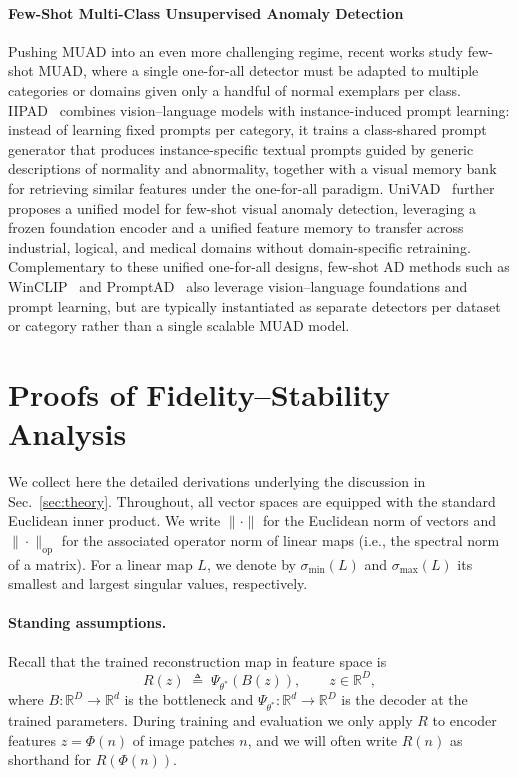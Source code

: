 \documentclass{article}
\theoremstyle{plain}
\theoremstyle{definition}
\theoremstyle{remark}
\begin{document}
\paragraph{Few-Shot Multi-Class Unsupervised Anomaly Detection}
Pushing MUAD into an even more challenging regime, recent works study few-shot MUAD, where a single one-for-all detector must be adapted to multiple categories or domains given only a handful of normal exemplars per class. IIPAD~\cite{lvone} combines vision--language models with instance-induced prompt learning: instead of learning fixed prompts per category, it trains a class-shared prompt generator that produces instance-specific textual prompts guided by generic descriptions of normality and abnormality, together with a visual memory bank for retrieving similar features under the one-for-all paradigm. UniVAD~\cite{gu2025univad} further proposes a unified model for few-shot visual anomaly detection, leveraging a frozen foundation encoder and a unified feature memory to transfer across industrial, logical, and medical domains without domain-specific retraining. Complementary to these unified one-for-all designs, few-shot AD methods such as WinCLIP~\cite{jeong2023winclip} and PromptAD~\cite{li2024promptad} also leverage vision--language foundations and prompt learning, but are typically instantiated as separate detectors per dataset or category rather than a single scalable MUAD model.




\section{Proofs of Fidelity--Stability Analysis}
\label{sec:proof}

We collect here the detailed derivations underlying the discussion in
Sec.~\ref{sec:theory}. Throughout, all vector spaces are equipped with
the standard Euclidean inner product. We write $\|\cdot\|$ for the
Euclidean norm of vectors and $\|\cdot\|_{\mathrm{op}}$ for the
associated operator norm of linear maps (i.e., the spectral norm of a
matrix). For a linear map $L$, we denote by $\sigma_{\min}(L)$ and
$\sigma_{\max}(L)$ its smallest and largest singular values,
respectively.

\paragraph{Standing assumptions.}
Recall that the trained reconstruction map in feature space is
\begin{equation}
    R(z) \;\triangleq\; \Psi_{\theta^*}(B(z)), \qquad z \in \mathbb{R}^D,
\end{equation}
where $B:\mathbb{R}^D\to\mathbb{R}^d$ is the bottleneck and
$\Psi_{\theta^*}:\mathbb{R}^d\to\mathbb{R}^D$ is the decoder at the
trained parameters. During training and evaluation we only apply $R$ to
encoder features $z = \Phi(n)$ of image patches $n$, and we will often
write $R(n)$ as shorthand for $R(\Phi(n))$.
\end{document}
